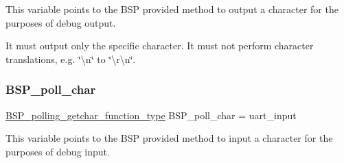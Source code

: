 This variable points to the B\+SP provided method to output a character for the purposes of debug output.

It must output only the specific character. It must not perform character translations, e.\+g. \char`\"{}\textbackslash{}n\char`\"{} to \char`\"{}\textbackslash{}r\textbackslash{}n\char`\"{}. \mbox{\label{uart-output-char_8c_ae5846eecdfa8f2813504371bf01c29b0}} 
\subsubsection{\texorpdfstring{BSP\_poll\_char}{BSP\_poll\_char}}
{\footnotesize\ttfamily \mbox{\hyperlink{bspIo_8h_a132b9ceff428a634ece5dfaac7ef1006}{B\+S\+P\+\_\+polling\+\_\+getchar\+\_\+function\+\_\+type}} B\+S\+P\+\_\+poll\+\_\+char = uart\+\_\+input}

This variable points to the B\+SP provided method to input a character for the purposes of debug input. 